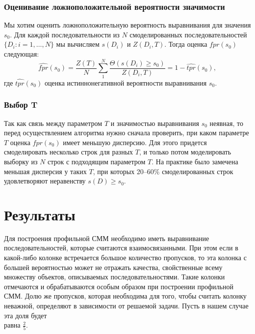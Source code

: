 \documentclass[specialist,
substylefile = spbu_report.rtx,
subf,href,colorlinks=true, 12pt]{disser}
\begin{document}
			\subsubsection{Оценивание ложноположительной вероятности значимости}			
			Мы хотим оценить ложноположительную вероятность выравнивания для значения $s_{0}$. Для каждой последовательности из $N$ смоделированных последовательностей $\{D_{i}:i=1,\dots,N\}$ мы вычисляем $s(D_{i})$ и $Z(D_{i}, T)$. Тогда оценка $fpr(s_{0})$ следующая:
			\begin{equation}	
				\widehat{fpr}(s_{0}) = \frac{Z(T)}{N} \sum_{1}^{N} \frac{\Theta(s(D_{i}) \geq s_{0})}{Z(D_{i}, T)} = 1-\widehat{tpr}(s_{0}),
			\end{equation}				
			где $\widehat{tpr}(s_{0})$ оценка истиннонегативной вероятности выравнивания $s_{0}$.
			
			\subsubsection{Выбор T}
			Так как связь между параметром $T$ и значимостью выравнивания $s_{0}$ неявная, то перед осуществлением алгоритма нужно сначала проверить, при каком параметре $T$ оценка $fpr(s_{0})$ имеет меньшую дисперсию. Для этого придется смоделировать несколько строк для разных $T$, и только потом моделировать выборку из $N$ строк с подходящим параметром $T$. На практике было замечена меньшая дисперсия у таких $T$, при которых 20--60$\%$ смоделированных строк удовлетворяют неравенству $s(D) \geq s_{0}$.
			
			\section{Результаты}						
			Для построения профильной СММ необходимо иметь выравнивание последовательностей, которые считаются взаимосвязанными. При этом если в какой-либо колонке встречается большое количество пропусков, то эта колонка с большей вероятностью может не отражать качества, свойственные всему множеству объектов, описываемых последовательностями. Такие колонки отмечаются и обрабатываются особым образом при построении профильной СММ. Долю же пропусков, которая необходима для того, чтобы считать колонку неважной, определяют в зависимости от решаемой задачи. Пусть в нашем случае эта доля будет \\равна $\frac{2}{5}$.
			
\end{document}
